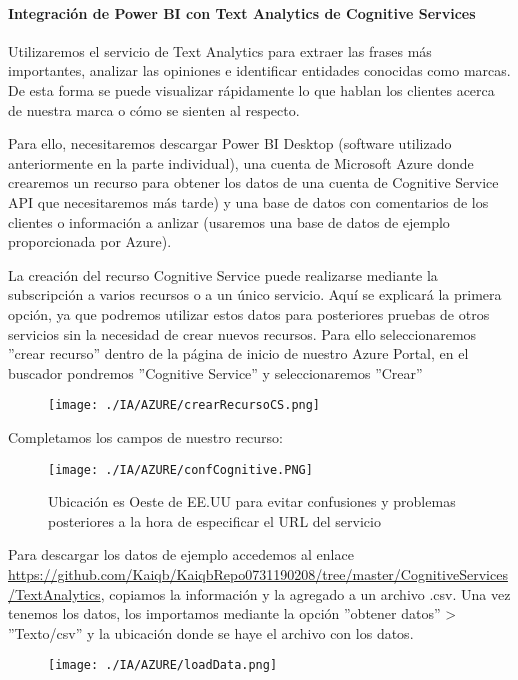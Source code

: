 \documentclass[runningheads]{llncs}
\begin{document}
\paragraph{Integración de Power BI con Text Analytics de Cognitive Services}
Utilizaremos el servicio de Text Analytics para extraer las frases más importantes, analizar las opiniones e identificar entidades conocidas como marcas. De esta forma se puede visualizar rápidamente lo que hablan los clientes acerca de nuestra marca o cómo se sienten al respecto.

Para ello, necesitaremos descargar Power BI Desktop (software utilizado anteriormente en la parte individual), una cuenta de Microsoft Azure donde crearemos un recurso para obtener los datos de una cuenta de Cognitive Service API que necesitaremos más tarde) y una base de datos con comentarios de los clientes o información a anlizar (usaremos una base de datos de ejemplo proporcionada por Azure).

La creación del recurso Cognitive Service puede realizarse mediante la subscripción a varios recursos o a un único servicio. Aquí se explicará la primera opción, ya que podremos utilizar estos datos para posteriores pruebas de otros servicios sin la necesidad de crear nuevos recursos. Para ello seleccionaremos ''crear recurso'' dentro de la página de inicio de nuestro Azure Portal, en el buscador pondremos ''Cognitive Service'' y seleccionaremos ''Crear''

\begin{figure}[H]

\texttt{[image: ./IA/AZURE/crearRecursoCS.png]}
\end{figure}
\newpage Completamos los campos de nuestro recurso:

\begin{figure}[H]
\centering
\texttt{[image: ./IA/AZURE/confCognitive.PNG]}
\caption{Ubicación es Oeste de EE.UU para evitar confusiones y problemas posteriores a la hora de especificar el URL del servicio}
\end{figure}


Para descargar los datos de ejemplo accedemos al enlace \url{ https://github.com/Kaiqb/KaiqbRepo0731190208/tree/master/CognitiveServices/TextAnalytics}, copiamos la información y la agregado a un archivo .csv. Una vez tenemos los datos, los importamos mediante la opción ''obtener datos'' > ''Texto/csv'' y la ubicación donde se haye el archivo con los datos.

\begin{figure}[H]

\texttt{[image: ./IA/AZURE/loadData.png]}
\end{figure}
\end{document}
